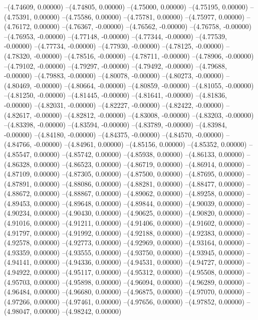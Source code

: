 --(4.74609, 0.00000)
--(4.74805, 0.00000)
--(4.75000, 0.00000)
--(4.75195, 0.00000)
--(4.75391, 0.00000)
--(4.75586, 0.00000)
--(4.75781, 0.00000)
--(4.75977, 0.00000)
--(4.76172, 0.00000)
--(4.76367, -0.00000)
--(4.76562, -0.00000)
--(4.76758, -0.00000)
--(4.76953, -0.00000)
--(4.77148, -0.00000)
--(4.77344, -0.00000)
--(4.77539, -0.00000)
--(4.77734, -0.00000)
--(4.77930, -0.00000)
--(4.78125, -0.00000)
--(4.78320, -0.00000)
--(4.78516, -0.00000)
--(4.78711, -0.00000)
--(4.78906, -0.00000)
--(4.79102, -0.00000)
--(4.79297, -0.00000)
--(4.79492, -0.00000)
--(4.79688, -0.00000)
--(4.79883, -0.00000)
--(4.80078, -0.00000)
--(4.80273, -0.00000)
--(4.80469, -0.00000)
--(4.80664, -0.00000)
--(4.80859, -0.00000)
--(4.81055, -0.00000)
--(4.81250, -0.00000)
--(4.81445, -0.00000)
--(4.81641, -0.00000)
--(4.81836, -0.00000)
--(4.82031, -0.00000)
--(4.82227, -0.00000)
--(4.82422, -0.00000)
--(4.82617, -0.00000)
--(4.82812, -0.00000)
--(4.83008, -0.00000)
--(4.83203, -0.00000)
--(4.83398, -0.00000)
--(4.83594, -0.00000)
--(4.83789, -0.00000)
--(4.83984, -0.00000)
--(4.84180, -0.00000)
--(4.84375, -0.00000)
--(4.84570, -0.00000)
--(4.84766, -0.00000)
--(4.84961, 0.00000)
--(4.85156, 0.00000)
--(4.85352, 0.00000)
--(4.85547, 0.00000)
--(4.85742, 0.00000)
--(4.85938, 0.00000)
--(4.86133, 0.00000)
--(4.86328, 0.00000)
--(4.86523, 0.00000)
--(4.86719, 0.00000)
--(4.86914, 0.00000)
--(4.87109, 0.00000)
--(4.87305, 0.00000)
--(4.87500, 0.00000)
--(4.87695, 0.00000)
--(4.87891, 0.00000)
--(4.88086, 0.00000)
--(4.88281, 0.00000)
--(4.88477, 0.00000)
--(4.88672, 0.00000)
--(4.88867, 0.00000)
--(4.89062, 0.00000)
--(4.89258, 0.00000)
--(4.89453, 0.00000)
--(4.89648, 0.00000)
--(4.89844, 0.00000)
--(4.90039, 0.00000)
--(4.90234, 0.00000)
--(4.90430, 0.00000)
--(4.90625, 0.00000)
--(4.90820, 0.00000)
--(4.91016, 0.00000)
--(4.91211, 0.00000)
--(4.91406, 0.00000)
--(4.91602, 0.00000)
--(4.91797, 0.00000)
--(4.91992, 0.00000)
--(4.92188, 0.00000)
--(4.92383, 0.00000)
--(4.92578, 0.00000)
--(4.92773, 0.00000)
--(4.92969, 0.00000)
--(4.93164, 0.00000)
--(4.93359, 0.00000)
--(4.93555, 0.00000)
--(4.93750, 0.00000)
--(4.93945, 0.00000)
--(4.94141, 0.00000)
--(4.94336, 0.00000)
--(4.94531, 0.00000)
--(4.94727, 0.00000)
--(4.94922, 0.00000)
--(4.95117, 0.00000)
--(4.95312, 0.00000)
--(4.95508, 0.00000)
--(4.95703, 0.00000)
--(4.95898, 0.00000)
--(4.96094, 0.00000)
--(4.96289, 0.00000)
--(4.96484, 0.00000)
--(4.96680, 0.00000)
--(4.96875, 0.00000)
--(4.97070, 0.00000)
--(4.97266, 0.00000)
--(4.97461, 0.00000)
--(4.97656, 0.00000)
--(4.97852, 0.00000)
--(4.98047, 0.00000)
--(4.98242, 0.00000)
